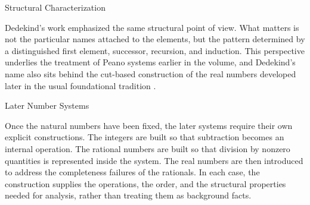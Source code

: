 \begin{topicbox}{Structural Characterization}
\begin{exposition}
Dedekind's work emphasized the same structural point of view. What matters is
not the particular names attached to the elements, but the pattern determined
by a distinguished first element, successor, recursion, and induction. This
perspective underlies the treatment of Peano systems earlier in the volume,
and Dedekind's name also sits behind the cut-based construction of the real
numbers developed later in the usual foundational tradition
\citep{dedekind1901essays}.
\end{exposition}
\end{topicbox}

\begin{topicbox}{Later Number Systems}
\begin{exposition}
Once the natural numbers have been fixed, the later systems require their own
explicit constructions. The integers are built so that subtraction becomes an
internal operation. The rational numbers are built so that division by
nonzero quantities is represented inside the system. The real numbers are
then introduced to address the completeness failures of the rationals. In
each case, the construction supplies the operations, the order, and the
structural properties needed for analysis, rather than treating them as
background facts.
\end{exposition}
\end{topicbox}
